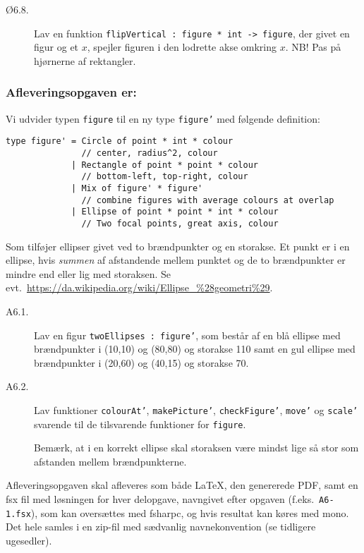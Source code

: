\documentclass[a4paper]{article}
\begin{document}
\begin{description}
\item[Ø6.8.] Lav en funktion \texttt{flipVertical : figure * int ->
  figure}, der givet en figur og et $x$, spejler figuren i den
  lodrette akse omkring $x$.  NB! Pas på hjørnerne af rektangler.

\end{description}

\subsubsection*{Afleveringsopgaven er:}

 Vi udvider typen \texttt{figure} til en ny type \texttt{figure'} med
 følgende definition:

\begin{verbatim}
type figure' = Circle of point * int * colour
               // center, radius^2, colour
             | Rectangle of point * point * colour
               // bottom-left, top-right, colour
             | Mix of figure' * figure'
               // combine figures with average colours at overlap
             | Ellipse of point * point * int * colour
               // Two focal points, great axis, colour
\end{verbatim}

\noindent
Som tilføjer ellipser givet ved to brændpunkter og en storakse.  Et
punkt er i en ellipse, hvis \emph{summen} af afstandende mellem
punktet og de to brændpunkter er mindre end eller lig med storaksen.
Se evt.\ \url{https://da.wikipedia.org/wiki/Ellipse_%28geometri%29}.


\begin{description}

\item[A6.1.] Lav en figur \texttt{twoEllipses : figure'}, som består
  af en blå ellipse med brændpunkter i (10,10) og (80,80) og storakse
  110 samt en gul ellipse med brændpunkter i (20,60) og (40,15) og
  storakse 70.

\item[A6.2.] Lav funktioner \texttt{colourAt'}, \texttt{makePicture'},
  \texttt{checkFigure'}, \texttt{move'} og \texttt{scale'} svarende
  til de tilsvarende funktioner for \texttt{figure}.

Bemærk, at i en korrekt ellipse skal storaksen være mindst lige
så stor som afstanden mellem brændpunkterne.

\end{description}

\noindent
Afleveringsopgaven skal afleveres som både \LaTeX, den genererede PDF,
samt en fsx fil med løsningen for hver delopgave, navngivet efter
opgaven (f.eks.\ \texttt{A6-1.fsx}), som kan oversættes med
fsharpc, og hvis resultat kan køres med mono.  Det hele samles i en
zip-fil med sædvanlig navnekonvention (se tidligere ugesedler).
\end{document}
